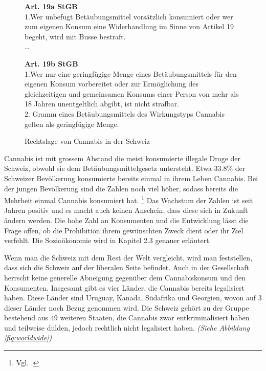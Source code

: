 \documentclass[../main.tex]{subfiles}
\begin{document}
	 \begin{figure}[H]
	 \begin{tcolorbox}
	 	\textbf{Art. 19a StGB}\\[7pt]
		1.\quad Wer unbefugt Betäubungsmittel vorsätzlich konsumiert oder wer zum eigenen Konsum eine Widerhandlung im Sinne von Artikel 19 begeht, wird mit Busse bestraft.\\[10pt]
		\ldots
	\end{tcolorbox}
	
	\begin{tcolorbox}
		\textbf{Art. 19b StGB}\\[7pt]
	 	1.\quad Wer nur eine geringfügige Menge eines Betäubungsmittels für den eigenen Konsum vorbereitet oder zur Ermöglichung des gleichzeitigen und gemeinsamen Konsums einer Person von mehr als 18 Jahren unentgeltlich abgibt, ist nicht strafbar.\\[10pt]
2. Gramm eines Betäubungsmittels des Wirkungstyps Cannabis gelten als geringfügige Menge.
	 \end{tcolorbox}
	 \captionsetup{font=small}
	 \caption{Rechtslage von Cannabis in der Schweiz}
	 \label{fig:stgb-art-19}
	 \end{figure}
	 
	 
	 \noindent
	 Cannabis ist mit grossem Abstand die meist konsumierte illegale Droge der Schweiz, obwohl sie dem Betäubungsmittelgesetz untersteht. 
	 Etwa 33.8\% der Schweizer Bevölkerung konsumierte bereits einmal in ihrem Leben Cannabis. 
	 Bei der jungen Bevölkerung sind die Zahlen noch viel höher, sodass bereits die Mehrheit einmal Cannabis konsumiert hat.%
	 \footnote{Vgl. \cite[85]{gmel}.}
	 Das Wachstum der Zahlen ist seit Jahren positiv und es macht auch keinen Anschein, dass diese sich in Zukunft ändern werden.
	 Die hohe Zahl an Konsumenten und die Entwicklung lässt die Frage offen, ob die Prohibition ihrem gewünschten Zweck dient oder ihr Ziel verfehlt.
	 Die Sozioökonomie wird in Kapitel 2.3 genauer erläutert.
	 
	 \noindent
	 Wenn man die Schweiz mit dem Rest der Welt vergleicht, wird man feststellen, dass sich die Schweiz auf der liberalen Seite befindet.
	 Auch in der Gesellschaft herrscht keine generelle Abneigung gegenüber dem Cannabiskonsum und den Konsumenten.	
	 Insgesamt gibt es vier Länder, die Cannabis bereits legalisiert haben.
	 Diese Länder sind Uruguay, Kanada, Südafrika und Georgien, wovon auf 3 dieser Länder noch Bezug genommen wird.
	 Die Schweiz gehört zu der Gruppe bestehend aus 49 weiteren Staaten, die Cannabis zwar entkriminalisiert haben und teilweise dulden, jedoch rechtlich nicht legalisiert haben. \textit{(Siehe Abbildung \ref{fig:worldwide})}\\
	 
\end{document}
